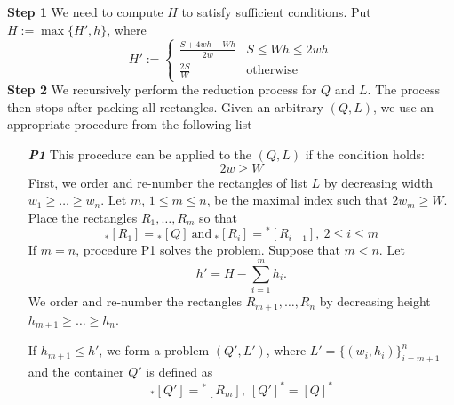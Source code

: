 \documentclass{article}
\theoremstyle{definition}
\theoremstyle{theorem}
\numberwithin{proposition}{section}
\begin{document}
    \textbf{Step 1} We need to compute $H$ to satisfy sufficient conditions. Put $H := \max\{H', h\}$, where
    \begin{equation*}
        H':=\begin{cases}
            \frac{S+4wh-Wh}{2w} & S \leq Wh \leq 2wh\\
            \frac{2S}{W} & \text{otherwise}
        \end{cases}
    \end{equation*}
    \textbf{Step 2} We recursively perform the reduction process for $Q$ and $L$. The process then stops after packing all rectangles. Given an arbitrary $(Q, L)$, we use an appropriate procedure from the following list
    \begin{enumerate}
        \item[\textbf{\textit{P1}}] 
            This procedure can be applied to the $(Q, L)$ if the condition holds: 
            \begin{equation*}
                2w \geq W
            \end{equation*}
            First, we order and re-number the rectangles of list $L$ by decreasing width $w_1 \geq\dots\geq w_n$. Let $m$, $1\leq m\leq n$, be the maximal index such that $2w_m\geq W$. Place the rectangles $R_1,\dots,R_m$ so that
            \begin{equation*}
                {}_{*}[R_1]={}_{*}[Q]~\text{and}~{}_{*}[R_i]={}^{*}[R_{i-1}],~2\leq i\leq m
            \end{equation*}
            If $m = n$, procedure P1 solves the problem. Suppose that $m < n$. Let
            \begin{equation*}
                h' =H-\sum_{i=1}^{m}h_i.
            \end{equation*}
            We order and re-number the rectangles $R_{m+1},\dots,R_n$ by decreasing height $h_{m+1}\geq\dots\geq h_n$. 

            If $h_{m+1}\leq h'$, we form a problem $(Q',L')$, where $L' = \{(w_i,h_i)\}_{i=m+1}^{n}$ and the container $Q'$ is defined as
            \begin{equation*}
                {}_{*}[Q'] = {}^{*}[R_m],~[Q']^{*} = [Q]^{*}
            \end{equation*}


\end{enumerate}
\end{document}
